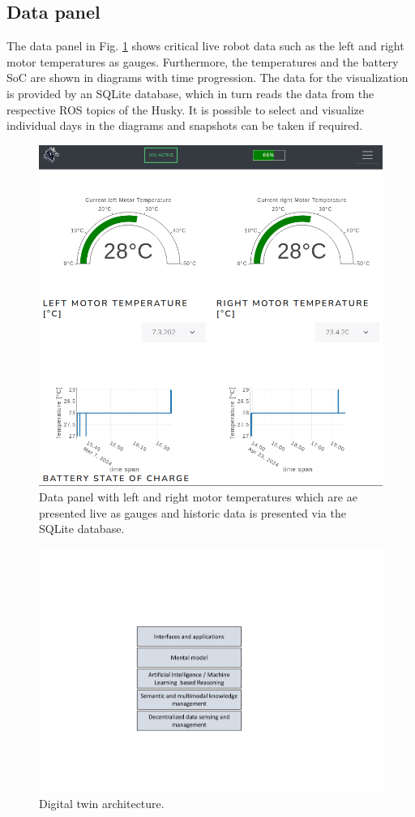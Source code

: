 \documentclass[letterpaper, 10 pt, conference]{ieeeconf}  %
\begin{document}
\subsection{Data panel}
The data panel in Fig. \ref{fig:overviewplots} shows critical live robot data such as the left and right motor temperatures as gauges. 
Furthermore, the temperatures and the battery SoC are shown in diagrams with time progression. 
The data for the visualization is provided by an SQLite database, which in turn reads the data from the respective ROS topics of the Husky. 
It is possible to select and visualize individual days in the diagrams and snapshots can be taken if required.
\begin{figure}[ht]
    \centerline{\includegraphics[width=\columnwidth]{images/tabletdatasm.png}}
    \caption{Data panel with left and right motor temperatures which are ae presented live as gauges and historic data is presented via the SQLite database.}
    \label{fig:overviewplots}
\end{figure}

\begin{figure}[b]
	\centerline{\includegraphics[width=0.5\columnwidth]{images/DT.pdf}}
	\caption{Digital twin architecture.}
	\label{fig:DT}
\end{figure}
\end{document}
